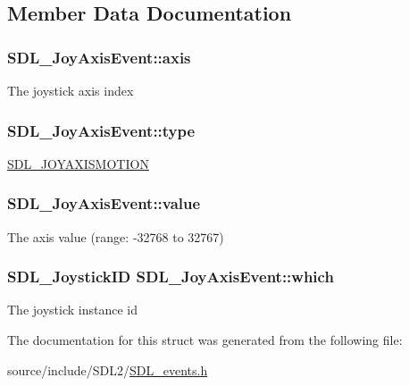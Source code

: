 \subsection{Member Data Documentation}
\hypertarget{struct_s_d_l___joy_axis_event_a0beac2fb161e45771c424bd0b6daeabb}{}
\subsubsection[{axis}]{ S\+D\+L\+\_\+\+Joy\+Axis\+Event\+::axis}\label{struct_s_d_l___joy_axis_event_a0beac2fb161e45771c424bd0b6daeabb}
The joystick axis index \hypertarget{struct_s_d_l___joy_axis_event_aed1c873fb90ba58194e65f972933c67d}{}
\subsubsection[{type}]{ S\+D\+L\+\_\+\+Joy\+Axis\+Event\+::type}\label{struct_s_d_l___joy_axis_event_aed1c873fb90ba58194e65f972933c67d}
\hyperlink{_s_d_l__events_8h_a3b589e89be6b35c02e0dd34a55f3fccaaf0803b3f8a12de3d85f81ebd7b514cd1}{S\+D\+L\+\_\+\+J\+O\+Y\+A\+X\+I\+S\+M\+O\+T\+I\+O\+N} \hypertarget{struct_s_d_l___joy_axis_event_a53ee73e7c367934dd6edb69963be5556}{}
\subsubsection[{value}]{ S\+D\+L\+\_\+\+Joy\+Axis\+Event\+::value}\label{struct_s_d_l___joy_axis_event_a53ee73e7c367934dd6edb69963be5556}
The axis value (range\+: -\/32768 to 32767) \hypertarget{struct_s_d_l___joy_axis_event_a965719f4703a7091bcc5f07f79fcf7e1}{}
\subsubsection[{which}]{\setlength{\rightskip}{0pt plus 5cm}S\+D\+L\+\_\+\+Joystick\+I\+D S\+D\+L\+\_\+\+Joy\+Axis\+Event\+::which}\label{struct_s_d_l___joy_axis_event_a965719f4703a7091bcc5f07f79fcf7e1}
The joystick instance id 

The documentation for this struct was generated from the following file\+:\begin{DoxyCompactItemize}
\item 
source/include/\+S\+D\+L2/\hyperlink{_s_d_l__events_8h}{S\+D\+L\+\_\+events.\+h}\end{DoxyCompactItemize}
